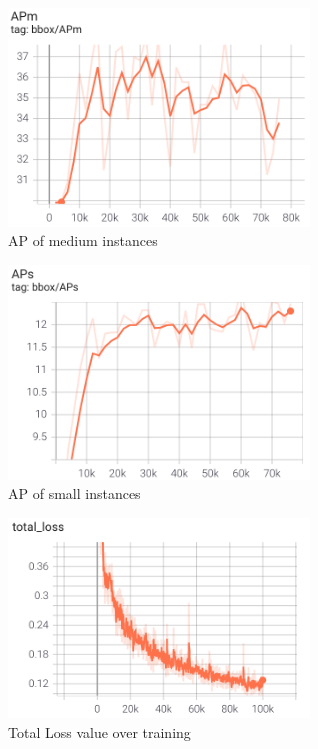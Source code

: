 \documentclass[conference]{IEEEtran}
\begin{document}
\begin{figure}[H]
    \centering
    \includegraphics[width=8cm]{Images/Faster/APM.png}
    \caption{AP of medium instances}
\end{figure}
\begin{figure}[H]
    \centering
    \includegraphics[width=8cm]{Images/Faster/APS.png}
    \caption{AP of small instances}
\end{figure}
\begin{figure}[H]
    \centering
    \includegraphics[width=8cm]{Images/Faster/TotalLoss.png}
    \caption{Total Loss value over training}
\end{figure}
\end{document}
